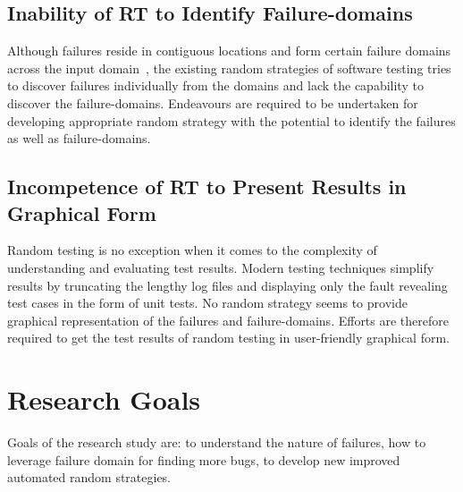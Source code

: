 \subsection{Inability of RT to Identify Failure-domains}
Although failures reside in contiguous locations and form certain failure domains across the input domain~\cite{chan1996proportional}, the existing random strategies of software testing tries to discover failures individually from the domains and lack the capability to discover the failure-domains. Endeavours are required to be undertaken for developing appropriate random strategy with the potential to identify the failures as well as failure-domains. 


\subsection{Incompetence of RT to Present Results in Graphical Form}
Random testing is no exception when it comes to the complexity of understanding and evaluating test results. Modern testing techniques simplify results by truncating the lengthy log files and displaying only the fault revealing test cases in the form of unit tests. No random strategy seems to provide graphical representation of the failures and failure-domains. Efforts are therefore required to get the test results of random testing in user-friendly graphical form. 


\section{Research Goals}\label{ResearchGoals_1}
Goals of the research study are: to understand the nature of failures, how to leverage failure domain for finding more bugs, to develop new improved automated random strategies.



